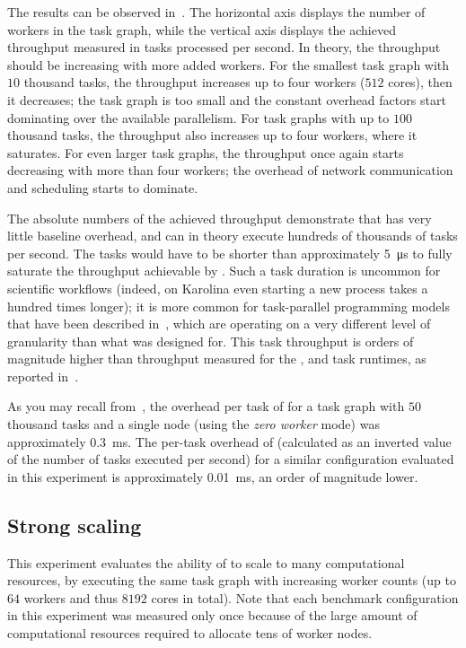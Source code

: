 The results can be observed in~. The horizontal axis displays the number of
workers in the task graph, while the vertical axis displays the achieved throughput measured in
tasks processed per second. In theory, the throughput should be increasing with more added workers. For
the smallest task graph with $10$ thousand tasks, the throughput increases up to
four workers ($512$ cores), then it decreases; the task graph is too small and the
constant overhead factors start dominating over the available parallelism. For task graphs with up
to $100$ thousand tasks, the throughput also increases up to four workers, where it
saturates. For even larger task graphs, the throughput once again starts decreasing with more than
four workers; the overhead of network communication and scheduling starts to dominate.

The absolute numbers of the achieved throughput demonstrate that \hyperqueue{} has very
little baseline overhead, and can in theory execute hundreds of thousands of tasks per second. The
tasks would have to be shorter than approximately \SI{5}{\micro\second} to fully saturate the
throughput achievable by \hyperqueue{}. Such a task duration is uncommon for scientific
workflows (indeed, on Karolina even starting a new process takes a hundred times longer); it is
more common for task-parallel programming models that have been described
in~, which are operating on a very different level of granularity than what
\hyperqueue{} was designed for. This task throughput is orders of magnitude higher than
throughput measured for the \parsl{}, \fireworks{} and
\dask{} task runtimes, as reported in~\cite{parsl}.

As you may recall from~, the overhead per task of \dask{}
for a task graph with $50$ thousand tasks and a single node (using the
\emph{zero worker} mode) was approximately \SI{0.3}{\milli\second}. The per-task overhead of
\hyperqueue{} (calculated as an
inverted value of the number of tasks executed per second) for a similar configuration evaluated in this experiment is approximately
\SI{0.01}{\milli\second}, an order of magnitude lower.

\subsection{Strong scaling}
\label{sec:hq-exp-scalability}
This experiment evaluates the ability of \hyperqueue{} to scale to many computational
resources, by executing the same task graph with increasing worker counts (up to
$64$ workers and thus $8192$ cores in total). Note that each
benchmark configuration in this experiment was measured only once because of the large amount of
computational resources required to allocate tens of worker nodes.

